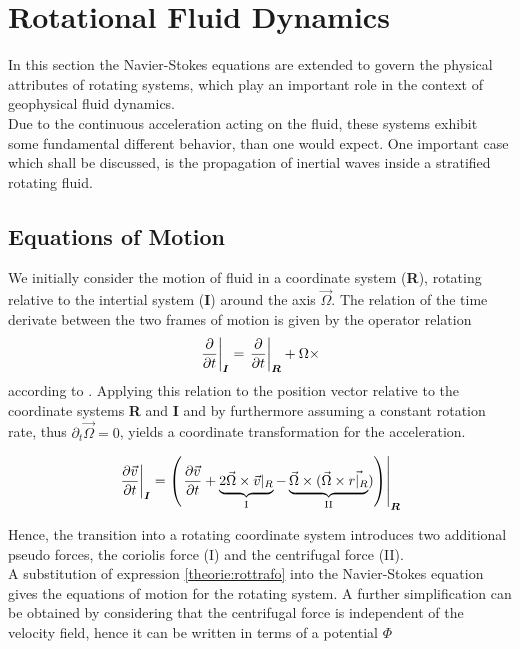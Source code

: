 \section{Rotational Fluid Dynamics}

In this section the Navier-Stokes equations are extended to govern the physical attributes of rotating systems,
which play an important role in the context of geophysical fluid dynamics.\\
Due to the continuous acceleration acting on the fluid, these systems exhibit some fundamental different behavior, than one would expect.
One important case which shall be discussed, is the propagation of inertial waves inside a stratified rotating fluid.\\

\subsection{Equations of Motion}
\label{THEORIE:ROT}

We initially consider the motion of fluid in a coordinate system (\textbf{R}), rotating relative to the intertial system (\textbf{I}) around the axis $\vec{\Omega}$.
The relation of the time derivate between the two frames of motion is given by the operator relation
\begin{align}
    \left.{\pdn[]{t}}\right|_{\bm{I}} = \left.\pdn[]{t}\right|_{\bm{R}} + \Omega \times
\end{align}
according to \citep{Tilgner2007}.
Applying this relation to the position vector relative to the coordinate systems \textbf{R} and \textbf{I}
and by furthermore assuming a constant rotation rate, thus $\partial_t\vec{\Omega} = 0$, yields a coordinate transformation for the acceleration.

\begin{align}
    \label{theorie:rottrafo}
    \left.\pdn[\vec{v}]{t}\right|_{\bm{I}} = \left(\left.\pdn[\vec{v}]{t}  + \underbrace{2\vec{\Omega} \times \vec{v}|_R}_{\text{I}}
    - \underbrace{\vec{\Omega} \times (\vec{\Omega} \times \vec{r|_R}}_{\text{II}})\right)\right|_{\bm{R}}
\end{align}

Hence, the transition into a rotating coordinate system introduces two additional pseudo forces, the coriolis force (I)  and the centrifugal force (II).\\
A substitution of expression \ref{theorie:rottrafo} into the Navier-Stokes equation gives the equations of motion for the rotating system.
A further simplification can be obtained by considering that the centrifugal force is independent of the velocity field,
hence it can be written in terms of a potential $\Phi$

